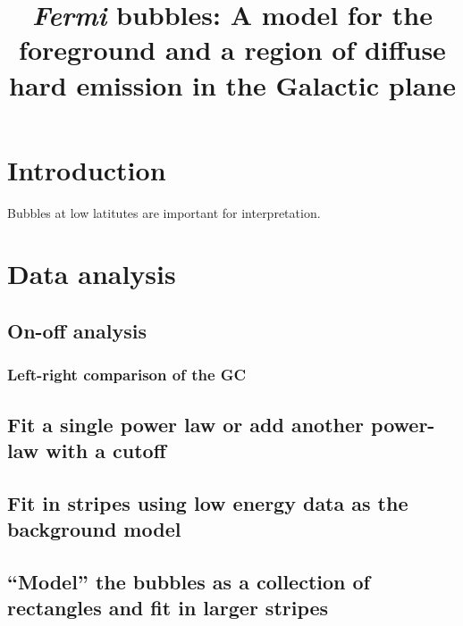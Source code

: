 \documentclass[a4paper]{article}
\newcommand{\Fermi}{\textit{Fermi} }
\begin{document}
\title{\Fermi bubbles: A model for the foreground and a region of diffuse hard emission in the Galactic plane}
\maketitle

\section{Introduction}
Bubbles at low latitutes are important for interpretation.




\section{Data analysis}

\subsection{On-off analysis}
\subsubsection{Left-right comparison of the GC}
\subsection{Fit a single power law or add another power-law with a cutoff}

\subsection{Fit in stripes using low energy data as the background model}

\subsection{``Model'' the bubbles as a collection of rectangles and fit in larger stripes}
\end{document}
